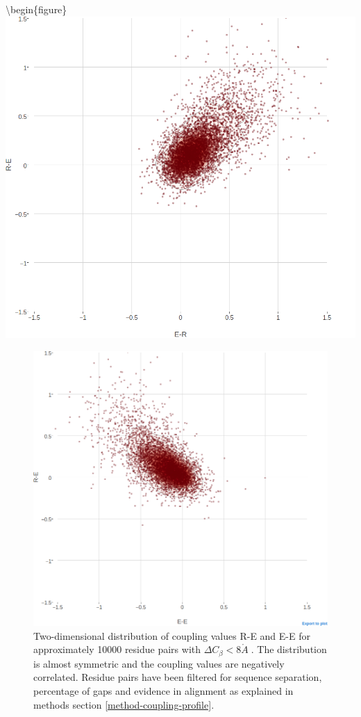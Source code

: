 \documentclass[12pt,a4paper,twoside]{book}
\newcommand{\Cb}{C_\beta}
\newcommand{\angstrom}{\mathring{A} \;}
\theoremstyle{definition}
\theoremstyle{definition}
\theoremstyle{remark}
\begin{document}
\textbackslash{}begin\{figure\}
\includegraphics[width=0.75\linewidth]{img/coupling_matrix_analysis/pairwise_couplings_R-E_E-R_Cbdistance_0_8_notitle}









\begin{figure}
\includegraphics[width=0.75\linewidth]{img/coupling_matrix_analysis/pairwise_couplings_R-E_E-E_Cbdistance_0_8_notitle} \caption{Two-dimensional distribution
of coupling values R-E and E-E for approximately 10000 residue pairs
with \(\Delta\Cb < 8\angstrom\). The distribution is almost symmetric
and the coupling values are negatively correlated. Residue pairs have
been filtered for sequence separation, percentage of gaps and evidence
in alignment as explained in methods section
\ref{method-coupling-profile}.}\label{fig:2d-coupling-profile-re-ee-0-8}
\end{figure}
\end{document}
